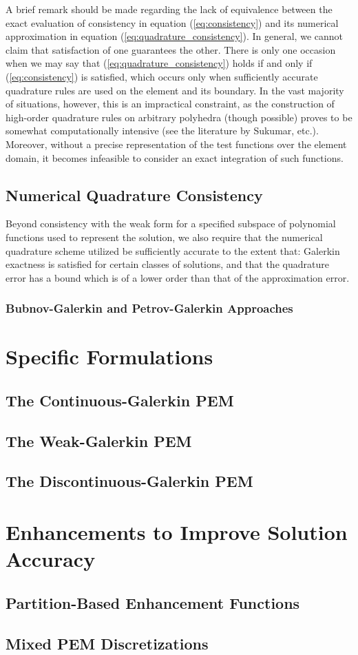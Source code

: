 A brief remark should be made regarding the lack of equivalence between the exact evaluation of consistency in equation (\ref{eq:consistency}) and its numerical approximation in equation (\ref{eq:quadrature_consistency}). In general, we cannot claim that satisfaction of one guarantees the other. There is only one occasion when we may say that (\ref{eq:quadrature_consistency}) holds if and only if (\ref{eq:consistency}) is satisfied, which occurs only when sufficiently accurate quadrature rules are used on the element and its boundary. In the vast majority of situations, however, this is an impractical constraint, as the construction of high-order quadrature rules on arbitrary polyhedra (though possible) proves to be somewhat computationally intensive (see the literature by Sukumar, etc.). Moreover, without a precise representation of the test functions over the element domain, it becomes infeasible to consider an exact integration of such functions.

\subsection{Numerical Quadrature Consistency}

Beyond consistency with the weak form for a specified subspace of polynomial functions used to represent the solution, we also require that the numerical quadrature scheme utilized be sufficiently accurate to the extent that: Galerkin exactness is satisfied for certain classes of solutions, and that the quadrature error has a bound which is of a lower order than that of the approximation error.

\subsubsection{Bubnov-Galerkin and Petrov-Galerkin Approaches}

\section{Specific Formulations}
\subsection{The Continuous-Galerkin PEM}
\subsection{The Weak-Galerkin PEM}
\subsection{The Discontinuous-Galerkin PEM}

\section{Enhancements to Improve Solution Accuracy}
\subsection{Partition-Based Enhancement Functions}
\subsection{Mixed PEM Discretizations}

